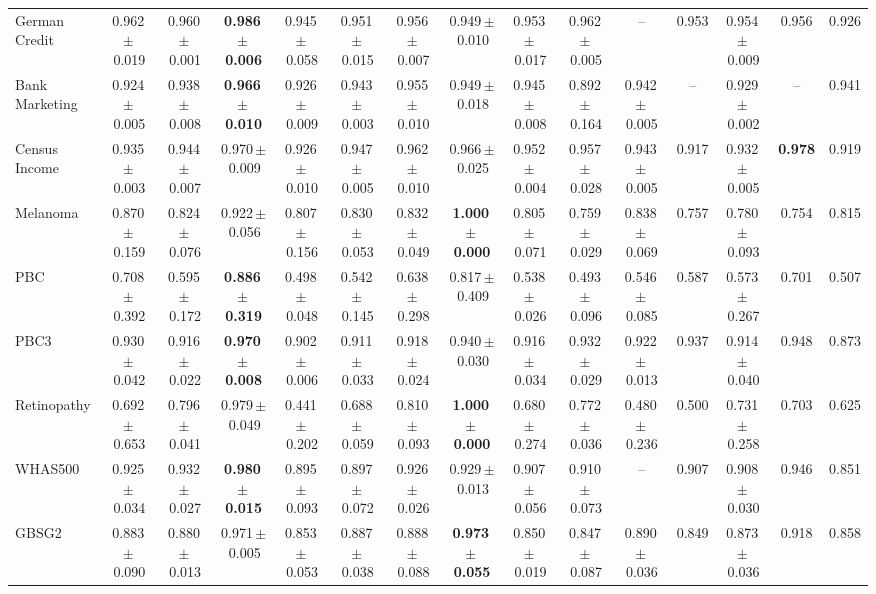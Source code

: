 \documentclass[8pt]{extarticle}
\begin{document}
\begin{longtable}{l*{14}{c}}
German Credit & 0.962\,$\pm$\,0.019 & 0.960\,$\pm$\,0.001 & \textbf{0.986\,$\pm$\,0.006} & 0.945\,$\pm$\,0.058 & 0.951\,$\pm$\,0.015 & 0.956\,$\pm$\,0.007 & 0.949\,$\pm$\,0.010 & 0.953\,$\pm$\,0.017 & 0.962\,$\pm$\,0.005 & -- & 0.953 & 0.954\,$\pm$\,0.009 & 0.956 & 0.926 \\
Bank Marketing & 0.924\,$\pm$\,0.005 & 0.938\,$\pm$\,0.008 & \textbf{0.966\,$\pm$\,0.010} & 0.926\,$\pm$\,0.009 & 0.943\,$\pm$\,0.003 & 0.955\,$\pm$\,0.010 & 0.949\,$\pm$\,0.018 & 0.945\,$\pm$\,0.008 & 0.892\,$\pm$\,0.164 & 0.942\,$\pm$\,0.005 & -- & 0.929\,$\pm$\,0.002 & -- & 0.941 \\
Census Income & 0.935\,$\pm$\,0.003 & 0.944\,$\pm$\,0.007 & 0.970\,$\pm$\,0.009 & 0.926\,$\pm$\,0.010 & 0.947\,$\pm$\,0.005 & 0.962\,$\pm$\,0.010 & 0.966\,$\pm$\,0.025 & 0.952\,$\pm$\,0.004 & 0.957\,$\pm$\,0.028 & 0.943\,$\pm$\,0.005 & 0.917 & 0.932\,$\pm$\,0.005 & \textbf{0.978} & 0.919 \\
Melanoma & 0.870\,$\pm$\,0.159 & 0.824\,$\pm$\,0.076 & 0.922\,$\pm$\,0.056 & 0.807\,$\pm$\,0.156 & 0.830\,$\pm$\,0.053 & 0.832\,$\pm$\,0.049 & \textbf{1.000\,$\pm$\,0.000} & 0.805\,$\pm$\,0.071 & 0.759\,$\pm$\,0.029 & 0.838\,$\pm$\,0.069 & 0.757 & 0.780\,$\pm$\,0.093 & 0.754 & 0.815 \\
PBC & 0.708\,$\pm$\,0.392 & 0.595\,$\pm$\,0.172 & \textbf{0.886\,$\pm$\,0.319} & 0.498\,$\pm$\,0.048 & 0.542\,$\pm$\,0.145 & 0.638\,$\pm$\,0.298 & 0.817\,$\pm$\,0.409 & 0.538\,$\pm$\,0.026 & 0.493\,$\pm$\,0.096 & 0.546\,$\pm$\,0.085 & 0.587 & 0.573\,$\pm$\,0.267 & 0.701 & 0.507 \\
PBC3 & 0.930\,$\pm$\,0.042 & 0.916\,$\pm$\,0.022 & \textbf{0.970\,$\pm$\,0.008} & 0.902\,$\pm$\,0.006 & 0.911\,$\pm$\,0.033 & 0.918\,$\pm$\,0.024 & 0.940\,$\pm$\,0.030 & 0.916\,$\pm$\,0.034 & 0.932\,$\pm$\,0.029 & 0.922\,$\pm$\,0.013 & 0.937 & 0.914\,$\pm$\,0.040 & 0.948 & 0.873 \\
Retinopathy & 0.692\,$\pm$\,0.653 & 0.796\,$\pm$\,0.041 & 0.979\,$\pm$\,0.049 & 0.441\,$\pm$\,0.202 & 0.688\,$\pm$\,0.059 & 0.810\,$\pm$\,0.093 & \textbf{1.000\,$\pm$\,0.000} & 0.680\,$\pm$\,0.274 & 0.772\,$\pm$\,0.036 & 0.480\,$\pm$\,0.236 & 0.500 & 0.731\,$\pm$\,0.258 & 0.703 & 0.625 \\
WHAS500 & 0.925\,$\pm$\,0.034 & 0.932\,$\pm$\,0.027 & \textbf{0.980\,$\pm$\,0.015} & 0.895\,$\pm$\,0.093 & 0.897\,$\pm$\,0.072 & 0.926\,$\pm$\,0.026 & 0.929\,$\pm$\,0.013 & 0.907\,$\pm$\,0.056 & 0.910\,$\pm$\,0.073 & -- & 0.907 & 0.908\,$\pm$\,0.030 & 0.946 & 0.851 \\
GBSG2 & 0.883\,$\pm$\,0.090 & 0.880\,$\pm$\,0.013 & 0.971\,$\pm$\,0.005 & 0.853\,$\pm$\,0.053 & 0.887\,$\pm$\,0.038 & 0.888\,$\pm$\,0.088 & \textbf{0.973\,$\pm$\,0.055} & 0.850\,$\pm$\,0.019 & 0.847\,$\pm$\,0.087 & 0.890\,$\pm$\,0.036 & 0.849 & 0.873\,$\pm$\,0.036 & 0.918 & 0.858 \\

\end{longtable}
\end{document}
